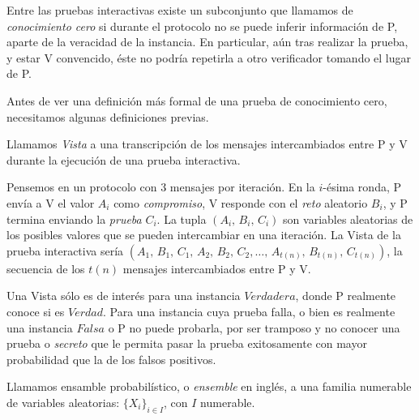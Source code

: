 


Entre las pruebas interactivas existe un subconjunto que llamamos de \textit{conocimiento cero} si durante el protocolo no se puede inferir información de P, aparte de la veracidad de la instancia. En particular, aún tras realizar la prueba, y estar V convencido, éste no podría repetirla a otro verificador tomando el lugar de P.

\hfil

Antes de ver una definición más formal de una prueba de conocimiento cero, necesitamos algunas definiciones previas.



\begin{definition}
	Llamamos \textit{Vista} a una transcripción de los mensajes intercambiados entre P y V durante la ejecución de una prueba interactiva.
\end{definition}


Pensemos en un protocolo con 3 mensajes por iteración. En la $i$-ésima ronda, P envía a V el valor $A_i$ como \textit{compromiso}, V responde con el \textit{reto} aleatorio $B_i$, y P termina enviando la \textit{prueba} $C_i$. La tupla $(A_i,\,B_i,\,C_i)$ son variables aleatorias de los posibles valores que se pueden intercambiar en una iteración. La Vista de la prueba interactiva sería $(A_1,\,B_1,\,C_1,\,A_2,\,B_2,\,C_2,\dots ,\,A_{t(n)},\,B_{t(n)},\,C_{t(n)})$, la secuencia de los $t(n)$ mensajes intercambiados entre P y V.

Una Vista sólo es de interés para una instancia $Verdadera$, donde P realmente conoce si es $Verdad$. Para una instancia cuya prueba falla, o bien es realmente una instancia $Falsa$ o P no puede probarla, por ser tramposo y no conocer una prueba o \textit{secreto} que le permita pasar la prueba exitosamente con mayor probabilidad que la de los falsos positivos.


\begin{definition}
	Llamamos ensamble probabilístico, o \textit{ensemble} en inglés, a una familia numerable de variables aleatorias: $\{X_i\}_{i\in I}$, con $I$ numerable.
\end{definition}

